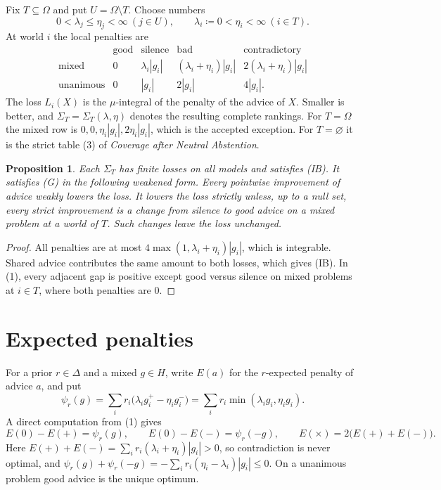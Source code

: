 \documentclass[11pt]{article}
\newtheorem{proposition}[theorem]{Proposition}
\theoremstyle{remark}\newtheorem{remark}[theorem]{Remark}
\begin{document}
Fix $T\subseteq\Omega$ and put $U=\Omega\setminus T$. Choose numbers
\[
 0<\lambda_j\le\eta_j<\infty\ (j\in U),\qquad
 \lambda_i\coloneqq0<\eta_i<\infty\ (i\in T).
\]
At world $i$ the local penalties are
\[
\begin{array}{c|cccc}
 &\text{good}&\text{silence}&\text{bad}&\text{contradictory}\\\hline
 \text{mixed}&0&\lambda_i|g_i|&(\lambda_i+\eta_i)|g_i|
     &2(\lambda_i+\eta_i)|g_i|\\
 \text{unanimous}&0&|g_i|&2|g_i|&4|g_i|.
\end{array}
\tag{1}
\]
The loss $L_i(X)$ is the $\mu$-integral of the penalty of the advice of $X$.
Smaller is better, and $\Sigma_T=\Sigma_T(\lambda,\eta)$ denotes the
resulting complete rankings. For $T=\Omega$ the mixed row is
$0,0,\eta_i|g_i|,2\eta_i|g_i|$, which is the accepted exception. For
$T=\varnothing$ it is the strict table (3) of \emph{Coverage after Neutral
Abstention}.

\begin{proposition}\label{prop:basic}
Each $\Sigma_T$ has finite losses on all models and satisfies (IB). It
satisfies (G) in the following weakened form. Every pointwise improvement
of advice weakly lowers the loss. It lowers the loss strictly unless, up
to a null set, every strict improvement is a change from silence to good
advice on a mixed problem at a world of $T$. Such changes leave the loss
unchanged.
\end{proposition}
\begin{proof}
All penalties are at most $4\max(1,\lambda_i+\eta_i)|g_i|$, which is
integrable. Shared advice contributes the same amount to both losses, which
gives (IB). In (1), every adjacent gap is positive except good versus
silence on mixed problems at $i\in T$, where both penalties are $0$.
\end{proof}

\section{Expected penalties}

For a prior $r\in\Delta$ and a mixed $g\in H$, write $E(a)$ for the
$r$-expected penalty of advice $a$, and put
\[
 \psi_r(g)=\sum_ir_i\bigl(\lambda_ig_i^+-\eta_ig_i^-\bigr)
 =\sum_ir_i\min(\lambda_ig_i,\eta_ig_i).
\]
A direct computation from (1) gives
\[
 E(0)-E(+)=\psi_r(g),\qquad E(0)-E(-)=\psi_r(-g),\qquad
 E(\times)=2\bigl(E(+)+E(-)\bigr).
\tag{2}
\]
Here $E(+)+E(-)=\sum_ir_i(\lambda_i+\eta_i)|g_i|>0$, so contradiction is
never optimal, and $\psi_r(g)+\psi_r(-g)=-\sum_ir_i(\eta_i-\lambda_i)|g_i|
\le0$. On a unanimous problem good advice is the unique optimum.
\end{document}
